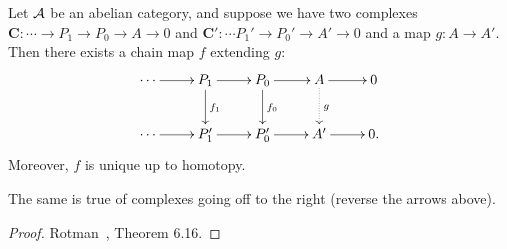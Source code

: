\begin{thm}
Let $\cal A$ be an abelian category, and suppose we have two complexes $\mathbf C:\cdots \to P_1\to P_0\to A\to 0$ and $\mathbf C':\cdots P_1'\to P_0'\to A'\to 0$ and a map $g:A\to A'$. Then there exists a chain map $f$ extending $g$:
\[
\xymatrix{
\cdots \ar[r] & P_1\ar[d]^{f_1}\ar[r] & P_0\ar[r]\ar[d]^{f_0}& A\ar[r]\ar@{.>}[d]^g &0\\
\cdots \ar[r] & P_1'\ar[r] & P_0'\ar[r] & A'\ar[r] & 0. 
}
\]
Moreover, $f$ is unique up to homotopy.

The same is true of complexes going off to the right (reverse the arrows above).
\end{thm}
\begin{proof}
Rotman~\cite{Ro09}, Theorem 6.16.
\end{proof}
